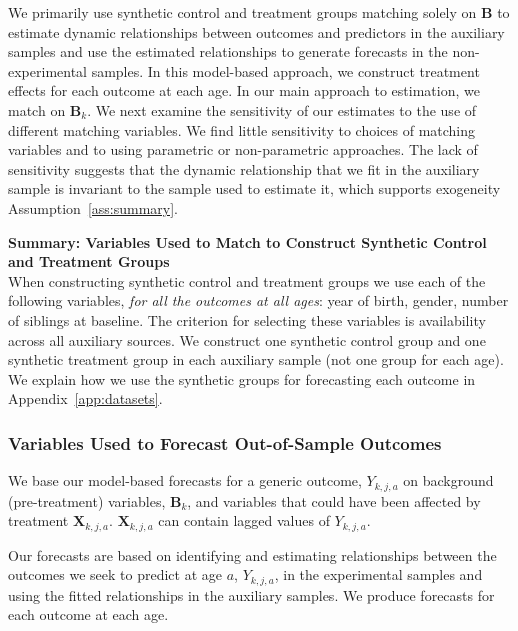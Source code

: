 \noindent We primarily use synthetic control and treatment groups matching solely on $\bm{B}$ to estimate dynamic relationships between outcomes and predictors in the auxiliary samples and use the estimated relationships to generate forecasts in the non-experimental samples. In this model-based approach, we construct treatment effects for each outcome at each age. In our main approach to estimation, we match on $\bm{B}_k$. We next examine the sensitivity of our estimates to the use of different matching variables. We find little sensitivity to choices of matching variables and to using parametric or non-parametric approaches. The lack of sensitivity suggests that the dynamic relationship that we fit in the auxiliary sample is invariant to the sample used to estimate it, which supports exogeneity Assumption~\ref{ass:summary}.


\noindent \textbf{Summary: Variables Used to Match to Construct Synthetic Control and Treatment Groups}\\
When constructing synthetic control and treatment groups we use each of the following variables, \textit{for all the outcomes at all ages}: year of birth, gender, number of siblings at baseline. The criterion for selecting these variables is availability across all auxiliary sources. We construct one synthetic control group and one synthetic treatment group in each auxiliary sample (not one group for each age). We explain how we use the synthetic groups for forecasting each outcome in Appendix~\ref{app:datasets}. \\


\subsubsection{Variables Used to Forecast Out-of-Sample Outcomes} \label{appendix:pred}

We base our model-based forecasts for a generic outcome, $Y_{k,j,a}$ on background (pre-treatment) variables, $\bm{B}_k$, and variables that could have been affected by treatment $\bm{X}_{k,j,a}$. $\bm{X}_{k,j,a}$ can contain lagged values of $Y_{k,j,a}$.

\noindent Our forecasts are based on identifying and estimating relationships between the outcomes we seek to predict at age $a$, $Y_{k,j,a}$, in the experimental samples and using the fitted relationships in the auxiliary samples. We produce forecasts for each outcome at each age.

